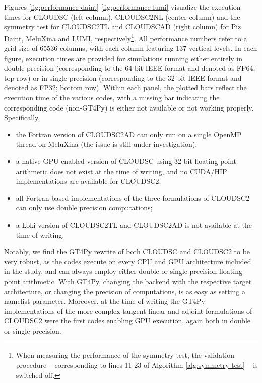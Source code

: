 \documentclass[main.tex]{subfiles}
\begin{document}
        Figures \ref{fig:performance-daint}-\ref{fig:performance-lumi} visualize the execution times for CLOUDSC (left column), CLOUDSC2NL  (center column) and the symmetry test for CLOUDSC2TL and CLOUDSCAD (right column) for Piz Daint, MeluXina and LUMI, respectively\footnote{When measuring the performance of the symmetry test, the validation procedure -- corresponding to lines 11-23 of Algorithm \ref{alg:symmetry-test} -- is switched off.}. All performance numbers refer to a grid size of 65536 columns, with each column featuring 137 vertical levels. In each figure, execution times are provided for simulations running either entirely in double precision (corresponding to the 64-bit IEEE format and denoted as FP64; top row) or in single precision (corresponding to the 32-bit IEEE format and denoted as FP32; bottom row). Within each panel, the plotted bars reflect the execution time of the various codes, with a missing bar indicating the corresponding code (non-GT4Py) is either not available or not working properly. Specifically,
        \begin{itemize}
            \item the Fortran version of CLOUDSC2AD can only run on a single OpenMP thread on MeluXina (the issue is still under investigation);
            \item a native GPU-enabled version of CLOUDSC using 32-bit floating point arithmetic does not exist at the time of writing, and no CUDA/HIP implementations are available for CLOUDSC2;
            \item all Fortran-based implementations of the three formulations of CLOUDSC2 can only use double precision computations;
            \item a Loki version of CLOUDSC2TL and CLOUDSC2AD is not available at the time of writing.
        \end{itemize}
        
        \noindent Notably, we find the GT4Py rewrite of both CLOUDSC and CLOUDSC2 to be very robust, as the codes execute on every CPU and GPU architecture included in the study, and can always employ either double or single precision floating point arithmetic. With GT4Py, changing the backend with the respective target architecture, or changing the precision of computations, is as easy as setting a namelist parameter. Moreover, at the time of writing the GT4Py implementations of the more complex tangent-linear and adjoint formulations of CLOUDSC2 were the first codes enabling GPU execution, again both in double or single precision.
\end{document}
